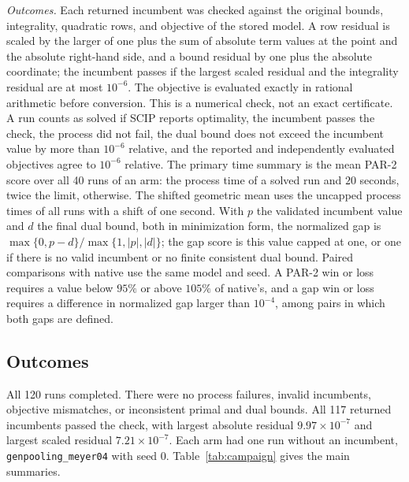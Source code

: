 \emph{Outcomes.} Each returned incumbent was checked against the original
bounds, integrality, quadratic rows, and objective of the stored model. A row
residual is scaled by the larger of one plus the sum of absolute term values at
the point and the absolute right-hand side, and a bound residual by one plus the
absolute coordinate; the incumbent passes if the largest scaled residual and the
integrality residual are at most $10^{-6}$. The objective is evaluated exactly
in rational arithmetic before conversion. This is a numerical check, not an
exact certificate. A run counts as solved if SCIP reports optimality, the
incumbent passes the check, the process did not fail, the dual bound does not
exceed the incumbent value by more than $10^{-6}$ relative, and the reported and
independently evaluated objectives agree to $10^{-6}$ relative. The primary
time summary is the mean PAR-2 score over all 40 runs of an arm: the process time
of a solved run and $20$ seconds, twice the limit, otherwise. The shifted
geometric mean uses the uncapped process times of all runs with a shift of one
second. With $p$ the validated incumbent value and $d$ the final dual bound,
both in minimization form, the normalized gap is
$\max\{0,p-d\}/\max\{1,|p|,|d|\}$; the gap score is this value capped at one, or
one if there is no valid incumbent or no finite consistent dual bound. Paired
comparisons with native use the same model and seed. A PAR-2 win or loss
requires a value below $95\%$ or above $105\%$ of native's, and a gap win or loss
requires a difference in normalized gap larger than $10^{-4}$, among pairs in
which both gaps are defined.

\subsection{Outcomes}\label{sec:experiments-outcomes}

All 120 runs completed. There were no process failures, invalid incumbents,
objective mismatches, or inconsistent primal and dual bounds. All 117 returned
incumbents passed the check, with largest absolute residual
$9.97\times10^{-7}$ and largest scaled residual $7.21\times10^{-7}$. Each arm had
one run without an incumbent, \texttt{genpooling\_meyer04} with seed $0$.
Table~\ref{tab:campaign} gives the main summaries.

